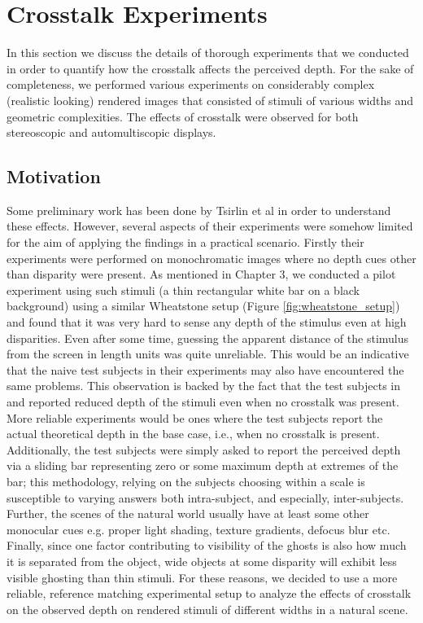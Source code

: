 \chapter{Crosstalk Experiments}
\label{chap:experiments}
In this section we discuss the details of thorough experiments that we conducted in order to quantify how the crosstalk affects the perceived depth. For the sake of completeness, we performed various experiments on considerably complex (realistic looking) rendered images that consisted of stimuli of various widths and geometric complexities. The effects of crosstalk were observed for both stereoscopic and automultiscopic displays.

\section{Motivation}
 Some preliminary work has been done by Tsirlin et al \cite{tsirlin2011effect}\cite{tsirlin2012crosstalk}\cite{tsirlin2012effect} in order to understand these effects. However, several aspects of their experiments were somehow limited for the aim of applying the findings in a practical scenario. Firstly their experiments were performed on monochromatic images where no depth cues other than disparity were present. As mentioned in Chapter 3, we conducted a pilot experiment using such stimuli (a thin rectangular white bar on a black background) using a similar Wheatstone setup (Figure \ref{fig:wheatstone_setup}) and found that it was very hard to sense any depth of the stimulus even at high disparities. Even after some time, guessing the apparent distance of the stimulus from the screen in length units was quite unreliable. This would be an indicative that the naive test subjects in their experiments may also have encountered the same problems. This observation is backed by the fact that the test subjects in \cite{tsirlin2012effect} and \cite{tsirlin2011effect} reported reduced depth of the stimuli even when no crosstalk was present. More reliable experiments would be ones where the test subjects report the actual theoretical depth in the base case, i.e., when no crosstalk is present. Additionally, the test subjects were simply asked to report the perceived depth via a sliding bar representing zero or some maximum depth at extremes of the bar; this methodology, relying on the subjects choosing within a scale is susceptible to varying answers both intra-subject, and especially, inter-subjects. Further, the scenes of the natural world usually have at least some other monocular cues e.g. proper light shading, texture gradients, defocus blur etc. Finally, since one factor contributing to visibility of the ghosts is also how much it is separated from the object, wide objects at some disparity will exhibit less visible ghosting than thin stimuli. For these reasons, we decided to use a more reliable, reference matching experimental setup to analyze the effects of crosstalk on the observed depth on rendered stimuli of different widths in a natural scene.


